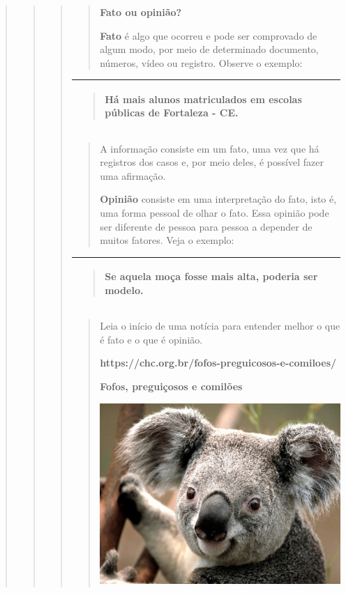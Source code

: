 \begin{quote}
\begin{quote}
\begin{quote}
\begin{quote}
\textbf{Fato ou opinião?}

\textbf{Fato} é algo que ocorreu e pode ser comprovado de algum modo,
por meio de determinado documento, números, vídeo ou registro. Observe o
exemplo:
\end{quote}

\begin{longtable}[]{@{}l@{}}
\toprule
\begin{minipage}[t]{0.97\columnwidth}\raggedright\strut
\begin{quote}
Há mais alunos matriculados em escolas públicas de Fortaleza - CE.
\end{quote}\strut
\end{minipage}\tabularnewline
\bottomrule
\end{longtable}

\begin{quote}
A informação consiste em um fato, uma vez que há registros dos casos e,
por meio deles, é possível fazer uma afirmação.

\textbf{Opinião} consiste em uma interpretação do fato, isto é, uma
forma pessoal de olhar o fato. Essa opinião pode ser diferente de pessoa
para pessoa a depender de muitos fatores. Veja o exemplo:
\end{quote}

\begin{longtable}[]{@{}l@{}}
\toprule
\begin{minipage}[t]{0.97\columnwidth}\raggedright\strut
\begin{quote}
Se aquela moça fosse mais alta, poderia ser modelo.
\end{quote}\strut
\end{minipage}\tabularnewline
\bottomrule
\end{longtable}

\begin{quote}
Leia o início de uma notícia para entender melhor o que é fato e o que é
opinião.

\textbf{https://chc.org.br/fofos-preguicosos-e-comiloes/}

\textbf{Fofos, preguiçosos e comilões}

\includegraphics[width=3.61389in,height=2.71042in]{media/image25.jpeg}


\end{quote}
\end{quote}
\end{quote}
\end{quote}
